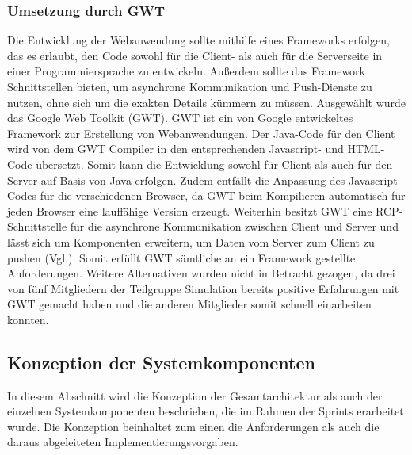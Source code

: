 \subsubsection{Umsetzung durch GWT}\label{GWT} 
Die Entwicklung der Webanwendung sollte mithilfe eines Frameworks erfolgen, das es erlaubt, den Code sowohl für die Client- als auch für die Serverseite in einer Programmiersprache zu entwickeln. Außerdem sollte das Framework Schnittstellen bieten, um asynchrone Kommunikation und Push-Dienste zu nutzen, ohne sich um die exakten Details kümmern zu müssen. Ausgewählt wurde das Google Web Toolkit (GWT). GWT ist ein von Google entwickeltes Framework zur Erstellung von Webanwendungen. Der Java-Code für den Client wird von dem GWT Compiler in den entsprechenden Javascript- und HTML-Code übersetzt. Somit kann die Entwicklung sowohl für Client als auch für den Server auf Basis von Java erfolgen. Zudem entfällt die Anpassung des Javascript-Codes für die verschiedenen Browser, da GWT beim Kompilieren automatisch für jeden Browser eine lauffähige Version erzeugt. Weiterhin besitzt GWT  eine RCP-Schnittstelle für die asynchrone Kommunikation zwischen Client und Server und lässt sich um Komponenten erweitern, um Daten vom Server zum Client zu pushen (Vgl.\cite{gwt}). Somit erfüllt GWT sämtliche an ein Framework gestellte Anforderungen. Weitere Alternativen wurden nicht in Betracht gezogen, da drei von fünf Mitgliedern der Teilgruppe Simulation bereits positive Erfahrungen mit GWT gemacht haben und die anderen Mitglieder somit schnell einarbeiten konnten. 
\subsection{Konzeption der Systemkomponenten}
In diesem Abschnitt wird die Konzeption der Gesamtarchitektur als auch der einzelnen Systemkomponenten beschrieben, die im Rahmen der Sprints erarbeitet wurde. Die Konzeption beinhaltet zum einen die Anforderungen als auch die daraus abgeleiteten Implementierungsvorgaben.
\newpage
